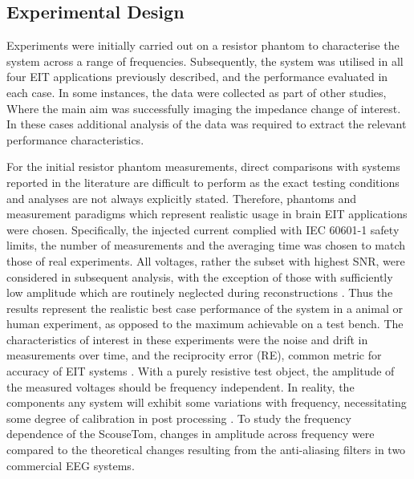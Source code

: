 \subsection{Experimental Design}

Experiments were initially carried out on a resistor phantom to characterise the system across a range of frequencies. Subsequently, the system was utilised in all four EIT applications previously described, and the performance evaluated in each case. In some instances, the data were collected as part of other studies, Where the main aim was successfully imaging the impedance change of interest. In these cases additional analysis of the data was required to extract the relevant performance characteristics.

For the initial resistor phantom measurements, direct comparisons with systems reported in the literature are difficult to perform as the exact testing conditions and analyses are not always explicitly stated.
Therefore, phantoms and measurement paradigms which represent realistic usage in brain EIT applications were chosen. Specifically, the injected current complied with IEC 60601-1 \cite{IEC} safety limits, the number of measurements and the averaging time was chosen to match those of real experiments. All voltages, rather the subset with highest SNR, were considered in subsequent analysis, with the exception of those with sufficiently low amplitude which are routinely neglected during reconstructions \cite{packham2012comparison}. Thus the results represent the realistic best case performance of the system in a animal or human experiment, as opposed to the maximum achievable on a test bench. The characteristics of interest in these experiments were the noise and drift in measurements over time, and the reciprocity error (RE), common metric for accuracy of EIT systems \cite{Hun_Wi_2014}. With a purely resistive test object, the amplitude of the measured voltages should be frequency independent. In reality, the components any system will exhibit some variations with frequency, necessitating some degree of calibration in post processing \cite{Hun_Wi_2014,McEwan_2006}. To study the frequency dependence of the ScouseTom, changes in amplitude across frequency were compared to the theoretical changes resulting from the anti-aliasing filters in two commercial EEG systems.


